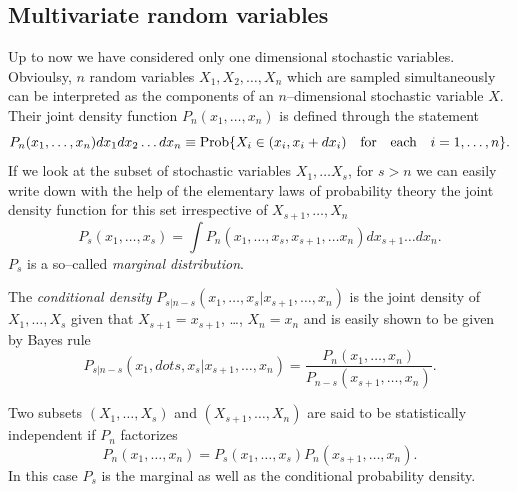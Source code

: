 \subsection{Multivariate random variables}
Up to now we have considered only one dimensional stochastic 
variables. Obvioulsy, $n$ random variables $X_1, X_2, \ldots, X_n$ 
which are sampled simultaneously can be interpreted as the 
components of an $n$--dimensional stochastic variable $X$.
Their joint density function
$P_n(x_1, \ldots, x_n)$ is defined through the statement
\begin{equation}
P_n(x_1, \ldots, x_n)dx_1 dx_2 \ldots dx_n \equiv
{\rm Prob}\{ X_i \in (x_i,x_i+dx_i) \quad {\rm for \quad
each \quad} i=1, \ldots , n\}.
\end{equation}
If we look at the subset of stochastic variables $X_1, \ldots 
X_s$, for $s>n$ we can easily write down with the help of the
elementary laws of probability theory the joint density function for 
this set irrespective of $X_{s+1}, \ldots, X_n$
\begin{equation}
P_s(x_1, \ldots, x_s) = \int P_n(x_1, \ldots, x_s, x_{s+1}, \ldots 
x_n) dx_{s+1} \ldots dx_{n}.
\end{equation}
$P_s$ is a so--called {\em marginal distribution}.

The {\em conditional density} 
$P_{s|n-s}(x_1,\dots,x_s|x_{s+1},\ldots,x_n)$ is the joint 
density of $X_1, \ldots , X_s$
given that $X_{s+1}=x_{s+1}$, \ldots , $X_n = x_n$ and is easily 
shown to be given by Bayes rule
\begin{equation}
P_{s|n-s}(x_1,dots,x_s|x_{s+1},\ldots,x_n) =
\frac{P_n(x_1, \ldots, x_n)}{P_{n-s}(x_{s+1}, \ldots, x_n)}.
\end{equation}

Two subsets $(X_1, \ldots, X_s)$ and $(X_{s+1}, \ldots, X_n)$ are 
said to be statistically  independent if $P_n$ factorizes
\begin{equation}
P_n(x_1, \ldots, x_n)=P_s(x_1, \ldots, x_s)P_n(x_{s+1}, \ldots, 
x_n).
\end{equation}
In this case $P_s$ is the marginal as well as the conditional 
probability density.

